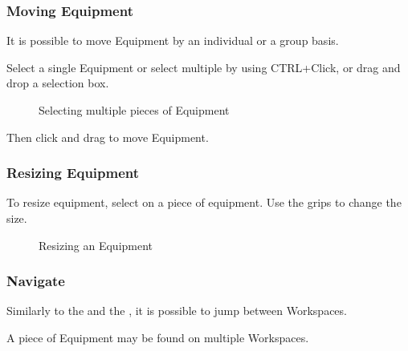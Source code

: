 \documentclass[letterpaper,10pt,english]{sphinxmanual}
\begin{document}
\subsubsection{Moving Equipment}
\label{\detokenize{docs/userguide/buildingelectricalmodel/riser/index-riser:moving-equipment}}
It is possible to move Equipment by an individual or a group basis.

Select a single Equipment or select multiple by using CTRL+Click, or drag and drop a selection box.

\begin{figure}[H]
\centering
\capstart

\noindent{}
\caption{Selecting multiple pieces of Equipment}\label{\detokenize{docs/userguide/buildingelectricalmodel/riser/index-riser:id24}}\end{figure}

Then click and drag to move Equipment.


\subsubsection{Resizing Equipment}
\label{\detokenize{docs/userguide/buildingelectricalmodel/riser/index-riser:resizing-equipment}}
To resize equipment, select on a piece of equipment.  Use the grips to change the size.

\begin{figure}[H]
\centering
\capstart

\noindent{}
\caption{Resizing an Equipment}\label{\detokenize{docs/userguide/buildingelectricalmodel/riser/index-riser:id25}}\end{figure}


\subsubsection{Navigate}
\label{\detokenize{docs/userguide/buildingelectricalmodel/riser/index-riser:navigate}}
Similarly to the {\hyperref[\detokenize{docs/userguide/buildingelectricalmodel/one-line/index-one-line:one-line}]{}} and the {\hyperref[\detokenize{docs/userguide/buildingelectricalmodel/schedules/index-schedules:schedules}]{}}, it is possible to jump between Workspaces.

A piece of Equipment may be found on multiple Workspaces.
\end{document}
